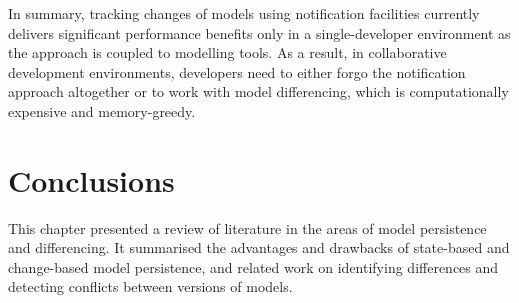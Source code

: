 In summary, tracking changes of models using notification facilities currently delivers significant performance benefits only in a single-developer environment as the approach is coupled to modelling tools. 
As a result, in collaborative development environments, 
developers need to either forgo the notification approach altogether 
or to work with model differencing, which is computationally expensive and 
memory-greedy.



\section{Conclusions}
\label{sec:conclusions_2}
This chapter presented a review of literature in the areas of model persistence and differencing. It summarised the advantages and drawbacks of state-based and change-based model persistence, and related work on identifying differences and detecting conflicts between versions of models.